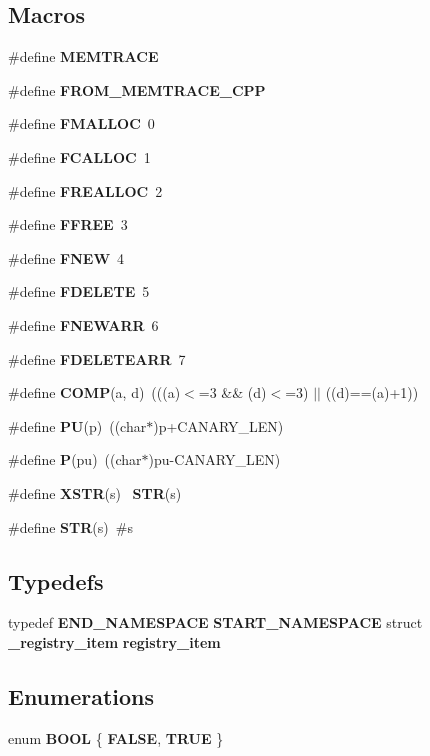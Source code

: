 \subsection*{Macros}
\begin{DoxyCompactItemize}
\item 
\#define \textbf{ M\+E\+M\+T\+R\+A\+CE}
\item 
\#define \textbf{ F\+R\+O\+M\+\_\+\+M\+E\+M\+T\+R\+A\+C\+E\+\_\+\+C\+PP}
\item 
\#define \textbf{ F\+M\+A\+L\+L\+OC}~0
\item 
\#define \textbf{ F\+C\+A\+L\+L\+OC}~1
\item 
\#define \textbf{ F\+R\+E\+A\+L\+L\+OC}~2
\item 
\#define \textbf{ F\+F\+R\+EE}~3
\item 
\#define \textbf{ F\+N\+EW}~4
\item 
\#define \textbf{ F\+D\+E\+L\+E\+TE}~5
\item 
\#define \textbf{ F\+N\+E\+W\+A\+RR}~6
\item 
\#define \textbf{ F\+D\+E\+L\+E\+T\+E\+A\+RR}~7
\item 
\#define \textbf{ C\+O\+MP}(a,  d)~(((a)$<$=3 \&\& (d)$<$=3) $\vert$$\vert$ ((d)==(a)+1))
\item 
\#define \textbf{ PU}(p)~((char$\ast$)p+C\+A\+N\+A\+R\+Y\+\_\+\+L\+EN)
\item 
\#define \textbf{ P}(pu)~((char$\ast$)pu-\/C\+A\+N\+A\+R\+Y\+\_\+\+L\+EN)
\item 
\#define \textbf{ X\+S\+TR}(s)~\textbf{ S\+TR}(s)
\item 
\#define \textbf{ S\+TR}(s)~\#s
\end{DoxyCompactItemize}
\subsection*{Typedefs}
\begin{DoxyCompactItemize}
\item 
typedef \textbf{ E\+N\+D\+\_\+\+N\+A\+M\+E\+S\+P\+A\+CE} \textbf{ S\+T\+A\+R\+T\+\_\+\+N\+A\+M\+E\+S\+P\+A\+CE} struct \textbf{ \+\_\+registry\+\_\+item} \textbf{ registry\+\_\+item}
\end{DoxyCompactItemize}
\subsection*{Enumerations}
\begin{DoxyCompactItemize}
\item 
enum \textbf{ B\+O\+OL} \{ \textbf{ F\+A\+L\+SE}, 
\textbf{ T\+R\+UE}
 \}
\end{DoxyCompactItemize}
